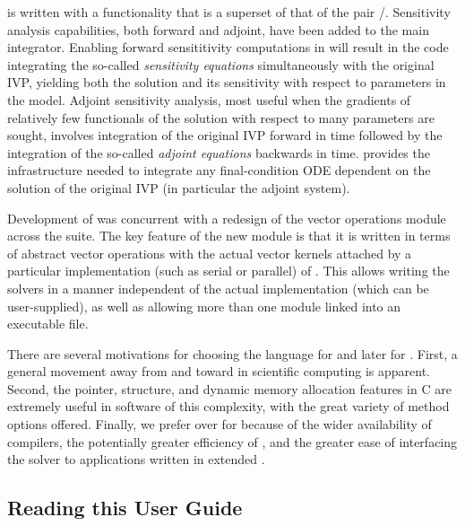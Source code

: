 {\cvodes} is written with a functionality that is a superset of that of the pair
{\cvode}/{\pvode}. Sensitivity analysis capabilities, both forward and adjoint, 
have been added to the main integrator. Enabling forward sensititivity computations 
in {\cvodes} will result in the code integrating the so-called {\em sensitivity equations}
simultaneously with the original IVP, yielding both the solution and its sensitivity
with respect to parameters in the model. Adjoint sensitivity analysis, most useful
when the gradients of relatively few functionals of the solution with respect to
many parameters are sought, involves integration of the original IVP forward in time
followed by the integration of the so-called {\em adjoint equations} backwards
in time. {\cvodes} provides the infrastructure needed to integrate any final-condition ODE
dependent on the solution of the original IVP (in particular the adjoint system). 

Development of {\cvodes} was concurrent with a redesign of the vector operations module
across the {\sundials} suite. The key feature of the new {\nvector} module is that it
is written in terms of abstract vector operations with the actual vector kernels attached
by a particular implementation (such as serial or parallel) of {\nvector}. This allows
writing the {\sundials} solvers in a manner independent of the actual {\nvector} 
implementation (which can be user-supplied), as well as allowing more than one 
{\nvector} module linked into an executable file.

There are several motivations for choosing the {\C} language for {\cvode} and later
for {\cvodes}.
First, a general movement away from {\F} and toward {\C} in scientific
computing is apparent.  Second, the pointer, structure, and dynamic
memory allocation features in C are extremely useful in software of
this complexity, with the great variety of method options offered.
Finally, we prefer {\C} over {\CPP} for {\cvodes} because of the wider
availability of {\C} compilers, the potentially greater efficiency of {\C},
and the greater ease of interfacing the solver to applications written
in extended {\F}.

\subsection{Reading this User Guide}\label{ss:reading}

